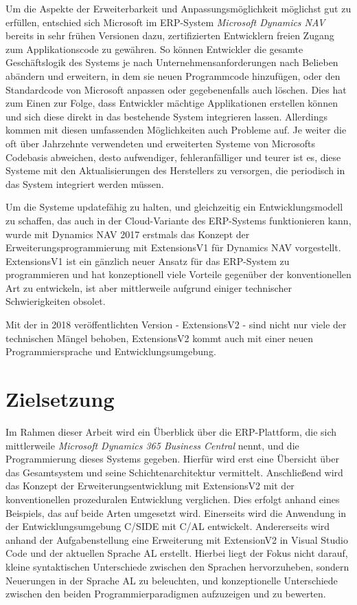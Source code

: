 Um die Aspekte der Erweiterbarkeit und Anpassungsmöglichkeit möglichst gut zu erfüllen, entschied sich Microsoft im ERP-System \textit{Microsoft Dynamics NAV} bereits in sehr frühen Versionen dazu, zertifizierten Entwicklern freien Zugang zum Applikationscode zu gewähren\cite{BrummelPatterns2015}. So können Entwickler die gesamte Geschäftslogik des Systems je nach Unternehmensanforderungen nach Belieben abändern und erweitern, in dem sie neuen Programmcode hinzufügen, oder den Standardcode von Microsoft anpassen oder gegebenenfalls auch löschen. Dies hat zum Einen zur Folge, dass Entwickler mächtige Applikationen erstellen können und sich diese direkt in das bestehende System integrieren lassen. Allerdings kommen mit diesen umfassenden Möglichkeiten auch Probleme auf. Je weiter die oft über Jahrzehnte verwendeten und erweiterten Systeme von Microsofts Codebasis abweichen, desto aufwendiger, fehleranfälliger und teurer ist es, diese Systeme mit den Aktualisierungen des Herstellers zu versorgen, die periodisch in das System integriert werden müssen.  

Um die Systeme updatefähig zu halten, und gleichzeitig ein Entwicklungsmodell zu schaffen, das auch in der Cloud-Variante des ERP-Systems funktionieren kann, wurde mit Dynamics NAV 2017 erstmals das Konzept der Erweiterungsprogrammierung mit ExtensionsV1 für Dynamics NAV vorgestellt. ExtensionsV1 ist ein gänzlich neuer Ansatz für das ERP-System zu programmieren und hat konzeptionell viele Vorteile gegenüber der konventionellen Art zu entwickeln, ist aber mittlerweile aufgrund einiger technischer Schwierigkeiten obsolet.

Mit der in 2018 veröffentlichten Version - ExtensionsV2 - sind nicht nur viele der technischen Mängel behoben, ExtensionsV2 kommt auch mit einer neuen Programmiersprache und Entwicklungsumgebung.

\section{Zielsetzung}
\label{sec:Zielsetzung}
Im Rahmen dieser Arbeit wird ein Überblick über die ERP-Plattform, die sich mittlerweile \textit{Microsoft Dynamics 365 Business Central} nennt, und die Programmierung dieses Systems gegeben. Hierfür wird erst eine Übersicht über das Gesamtsystem und seine Schichtenarchitektur vermittelt. Anschließend wird das Konzept der Erweiterungsentwicklung mit ExtensionsV2 mit der konventionellen prozeduralen Entwicklung verglichen. Dies erfolgt anhand eines Beispiels, das auf beide Arten umgesetzt wird. Einerseits wird die Anwendung in der Entwicklungsumgebung C/SIDE mit C/AL entwickelt. Andererseits wird anhand der Aufgabenstellung eine Erweiterung mit ExtensionV2 in Visual Studio Code und der aktuellen Sprache AL erstellt. Hierbei liegt der Fokus nicht darauf, kleine syntaktischen Unterschiede zwischen den Sprachen hervorzuheben, sondern Neuerungen in der Sprache AL zu beleuchten, und konzeptionelle Unterschiede zwischen den beiden Programmierparadigmen aufzuzeigen und zu bewerten.

